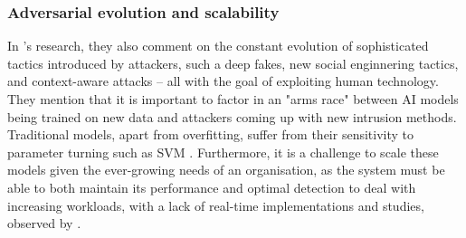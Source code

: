 
\subsubsection*{Adversarial evolution and scalability}
In \cite{kapoor2024comparative}'s research, they also comment on the constant evolution of sophisticated tactics introduced by attackers, such a deep fakes, new social enginnering tactics, and context-aware attacks -- all with the goal of exploiting human technology. They mention that it is important to factor in an "arms race" between AI models being trained on new data and attackers coming up with new intrusion methods. Traditional models, apart from overfitting, suffer from their sensitivity to parameter turning such as SVM \citep{andriu2023adaptive}. Furthermore, it is a challenge to scale these models given the ever-growing needs of an organisation, as the system must be able to both maintain its performance and optimal detection to deal with increasing workloads, with a lack of real-time implementations and studies, observed by \cite{atlam2022business}.

